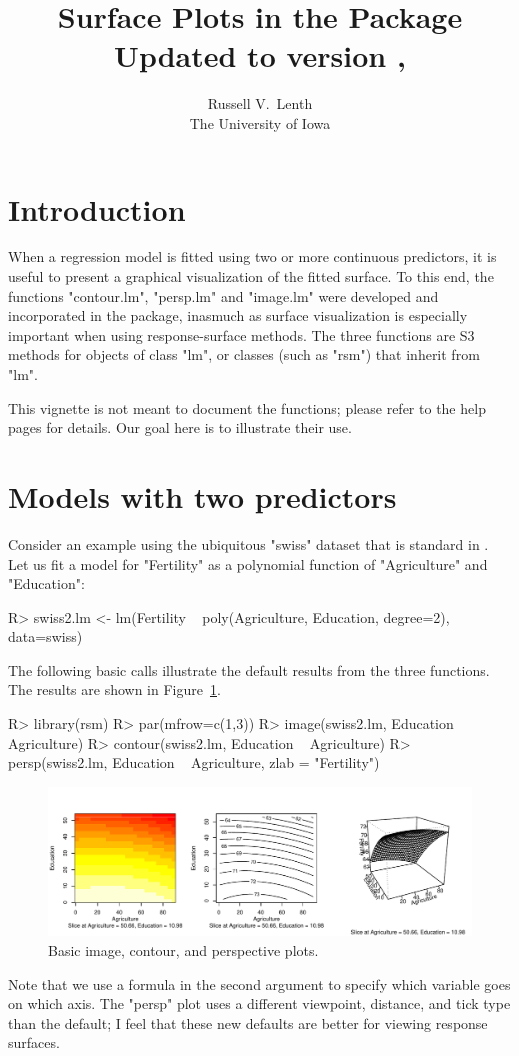 \documentclass[article,nojss]{jss}
\author{Russell V.~Lenth\\The University of Iowa}
\title{Surface Plots in the \pkg{rsm} Package\\
\normalsize Updated to version \VERSION, \DATE}
\def\rsm{\pkg{rsm}}
\def\R{\proglang{R}}
\begin{document}
\section{Introduction}
When a regression model is fitted using two or more continuous predictors, it is useful to present a graphical visualization of the fitted surface.  
To this end, the functions "contour.lm", "persp.lm" and "image.lm" were developed and incorporated in the \rsm{} package, inasmuch as surface visualization is especially important when using response-surface methods.  The three functions are S3 methods for objects of class "lm", or classes (such as "rsm") that inherit from "lm".

This vignette is not meant to document the functions; please refer to the help pages for details.  Our goal here is to illustrate their use.

\section{Models with two predictors}
Consider an example using the ubiquitous "swiss" dataset that is standard in \R{}.  Let us fit a model for "Fertility" as a polynomial function of "Agriculture" and "Education":
\begin{Schunk}
\begin{Sinput}
R> swiss2.lm <- lm(Fertility ~ poly(Agriculture, Education, degree=2), data=swiss)
\end{Sinput}
\end{Schunk}
The following basic calls illustrate the default results from the three functions.  The results are shown in Figure~\ref{basics}.
\begin{Schunk}
\begin{Sinput}
R> library(rsm)
R> par(mfrow=c(1,3))
R> image(swiss2.lm, Education ~ Agriculture)
R> contour(swiss2.lm, Education ~ Agriculture)
R> persp(swiss2.lm, Education ~ Agriculture, zlab = "Fertility")
\end{Sinput}
\end{Schunk}
\begin{figure}
\includegraphics[width=\linewidth, viewport=0 0 583 183, clip]{rsm-plots-basics.pdf}
\caption{Basic image, contour, and perspective plots.}\label{basics}
\end{figure}
Note that we use a formula in the second argument to specify which variable goes on which axis.  The "persp" plot uses a different viewpoint, distance, and tick type than the default; I feel that these new defaults are better for viewing response surfaces.
\end{document}
